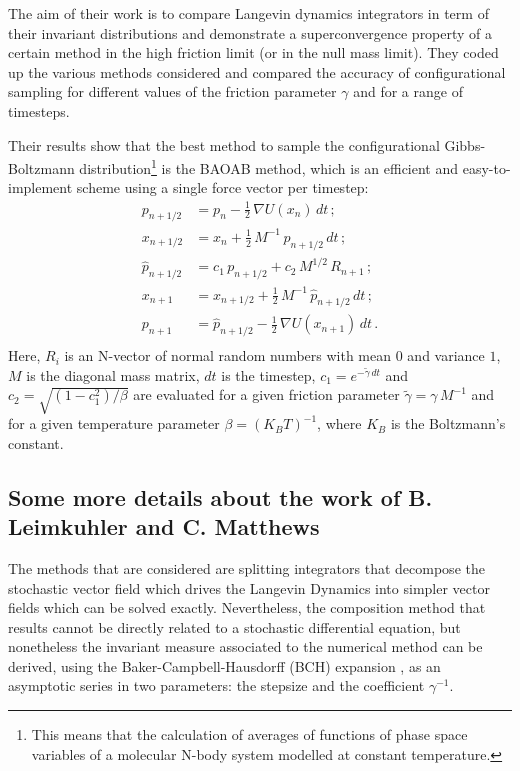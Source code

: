 \documentclass[10pt,a4paper]{book}
\theoremstyle{definition}
\begin{document}
The aim of their work is to compare Langevin dynamics integrators in term of their invariant distributions and demonstrate a superconvergence property of a certain method in the high friction limit (or in the null mass limit). They coded up the various methods considered and compared the accuracy of configurational sampling for different values of the friction parameter $\gamma$ and for a range of timesteps.

Their results show that the best method to sample the configurational Gibbs-Boltzmann distribution\footnote{This means that the calculation of averages of functions of phase space variables of a molecular N-body system modelled at constant temperature.} is the BAOAB method, which is an efficient and easy-to-implement scheme using a single force vector per timestep:
\begin{align*}
 p_{n+1/2} &= p_n-\frac{1}{2}\,\nabla U\left(x_n\right)\,dt\,; \\
 x_{n+1/2} &= x_n+\frac{1}{2}\,M^{-1}\,p_{n+1/2}\,dt\,; \\
 \widehat{p}_{n+1/2} &= c_1\,p_{n+1/2}+c_2\,M^{1/2}\,R_{n+1}\,; \\ 
 x_{n+1} &= x_{n+1/2}+\frac{1}{2}\,M^{-1}\,\widehat{p}_{n+1/2}\,dt\,; \\
 p_{n+1} &= \widehat{p}_{n+1/2}-\frac{1}{2}\,\nabla U\left(x_{n+1}\right)\,dt\,. \\
\end{align*}
Here, $R_i$ is an N-vector of normal random numbers with mean $0$ and variance $1$, $M$ is the diagonal mass matrix, $dt$ is the timestep, 
$c_1=e^{-\widetilde{\gamma}\,dt}$ and $c_2=\sqrt{\left(1-c_1^2\right)/\beta}$ are evaluated for a given friction parameter $\widetilde{\gamma}=\gamma\,M^{-1}$ and for a given temperature parameter $\beta=(K_BT)^{-1}$, where $K_B$ is the Boltzmann's constant.

\subsection{Some more details about the work of B. Leimkuhler and C. Matthews}
The methods that are considered are splitting integrators that decompose the stochastic vector field which drives the Langevin Dynamics into simpler vector fields which can be solved exactly. Nevertheless, the composition method that results cannot be directly related to a stochastic differential equation, but nonetheless the invariant measure associated to the numerical method can be derived, using the Baker-Campbell-Hausdorff (BCH) expansion \cite{bernardini1993Metodi,evans2008}, as an asymptotic series in two parameters: the stepsize and the coefficient $\gamma^{-1}$. 
\end{document}

